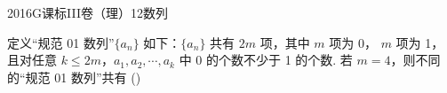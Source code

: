 
\begin{problem}{2016}{G}{课标III卷（理）}{12}{数列}

定义“规范 01 数列”$\{a_n\}$ 如下：$\{a_n\}$ 共有 $2m$ 项，其中 $m$ 项为 0， $m$ 项为 1，且对任意 $k \le 2m$，$a_1, a_2, \cdots, a_k$ 中 0 的个数不少于 1 的个数. 若 $m=4$，则不同的“规范 01 数列”共有 (\hspace{1cm})

\begin{choices}





\end{choices}

\end{problem}